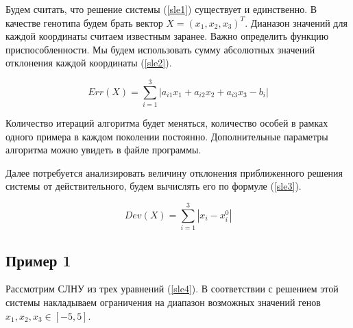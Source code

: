 \documentclass[12pt, a4paper]{article}
\begin{document}
    Будем считать, что решение системы (\ref{sle1}) существует и 
    единственно. В качестве генотипа будем брать вектор $X = (x_{1}, x_{2}, 
    x_{3})^T$. Дианазон значений для каждой координаты считаем известным 
    заранее. Важно определить функцию приспособленности. Мы будем 
    использовать сумму абсолютных значений отклонения каждой координаты 
    (\ref{sle2}).
    
    \begin{equation}
        Err(X) = \sum_{i=1}^{3} |a_{i1}x_{1} + a_{i2}x_{2} + a_{i3}x_{3} - b_{i}|
        \label{sle2}
    \end{equation}
    
    Количество итераций алгоритма будет меняться, количество особей в рамках 
    одного примера в каждом поколении постоянно. Дополнительные параметры 
    алгоритма можно увидеть в файле программы.
    
    Далее потребуется анализировать величину отклонения приближенного 
    решения системы от действительного, будем вычислять его по формуле 
    (\ref{sle3}).
    
    \begin{equation}
        Dev(X) = \sum_{i=1}^{3} |x_{i} - x^{0}_{i}|
        \label{sle3}
    \end{equation}
    
    \subsection{Пример 1}
    
    Рассмотрим СЛНУ из трех уравнений (\ref{sle4}). В соответствии с 
    решением этой системы накладываем ограничения на диапазон возможных 
    значений генов $x_{1}, x_{2}, x_{3} \in [-5, 5]$.
    
\end{document}
